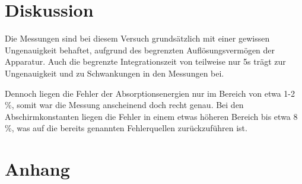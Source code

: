 \section{Diskussion}
\label{sec:Diskussion}
Die Messungen sind bei diesem Versuch grundsätzlich mit einer gewissen Ungenauigkeit behaftet,
aufgrund des begrenzten Auflösungsvermögen der Apparatur. Auch die begrenzte Integrationszeit von
teilweise nur 5s trägt zur Ungenauigkeit und zu Schwankungen in den Messungen bei.


\noindent Dennoch liegen die Fehler der Absorptionsenergien nur im Bereich von etwa 1-2 \%,
somit war die Messung anscheinend doch recht genau. Bei den Abschirmkonstanten liegen
die Fehler in einem etwas höheren Bereich bis etwa 8 \%, was auf die bereits genannten Fehlerquellen
zurückzuführen ist.

\section{Anhang}








